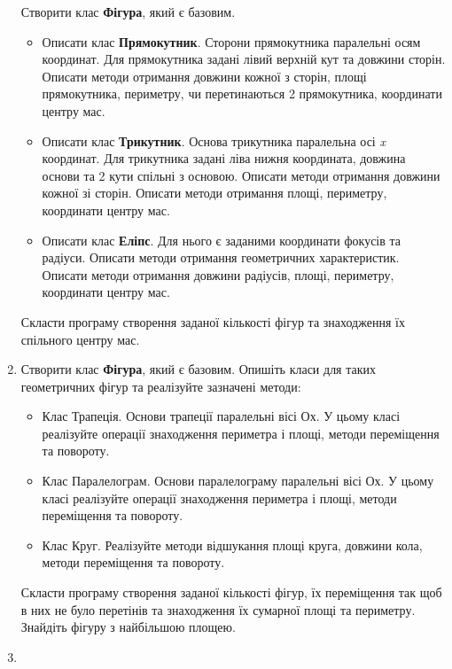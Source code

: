 \documentclass[a5paper,titlepage,openany,twoside,draft]{book_unv}%
\begin{document}
\begin{enumerate}
Створити клас \textbf{Фігура}, який є базовим.
\begin{itemize}
\item
Описати клас \textbf{Прямокутник}. Сторони прямокутника паралельні осям
координат. Для прямокутника задані лівий верхній кут та довжини сторін.
Описати методи отримання довжини кожної з сторін, площі прямокутника,
периметру, чи перетинаються 2 прямокутника, координати центру мас. 
\item
Описати клас \textbf{Трикутник}. Основа трикутника паралельна осі
\emph{x} координат. Для трикутника задані ліва нижня координата,
довжина основи та 2 кути спільні з основою. Описати методи отримання довжини кожної зі сторін.
Описати методи отримання площі, периметру, координати центру мас.  
\item
Описати клас \textbf{Еліпс}. Для нього є заданими координати фокусів та радіуси.
Описати методи отримання геометричних характеристик. Описати методи
отримання довжини радіусів, площі, периметру, координати центру мас. 
\end{itemize}

Скласти програму створення заданої кількості фігур та знаходження їх спільного центру мас.


\item
Створити клас \textbf{Фігура}, який є базовим.  Опишіть класи для 
таких геометричних фігур та реалізуйте зазначені методи:
\begin{itemize}
\item
  Клас Трапеція. Основи трапеції паралельні вісі Ох. У цьому класі реалізуйте операції 
знаходження периметра і площі, методи переміщення та повороту.
\item
  Клас Паралелограм. Основи паралелограму паралельні вісі Ох. 
У цьому класі реалізуйте операції знаходження периметра і площі, 
методи переміщення та повороту.
\item
  Клас Круг. Реалізуйте методи відшукання площі круга, довжини кола,
  методи переміщення та повороту.
\end{itemize}
Скласти програму створення заданої кількості фігур, їх переміщення так щоб в них не було
перетінів та знаходження їх сумарної площі та периметру. 
Знайдіть фігуру з найбільшою площею.


\item


\end{enumerate}
\end{document}
